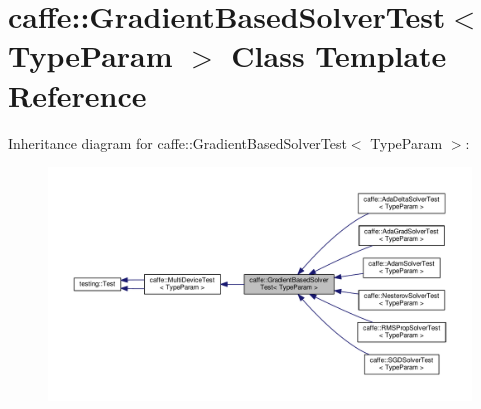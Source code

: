\hypertarget{classcaffe_1_1_gradient_based_solver_test}{}\section{caffe\+:\+:Gradient\+Based\+Solver\+Test$<$ Type\+Param $>$ Class Template Reference}
\label{classcaffe_1_1_gradient_based_solver_test}


Inheritance diagram for caffe\+:\+:Gradient\+Based\+Solver\+Test$<$ Type\+Param $>$\+:
\nopagebreak
\begin{figure}[H]
\begin{center}
\leavevmode
\includegraphics[width=350pt]{classcaffe_1_1_gradient_based_solver_test__inherit__graph}
\end{center}
\end{figure}
